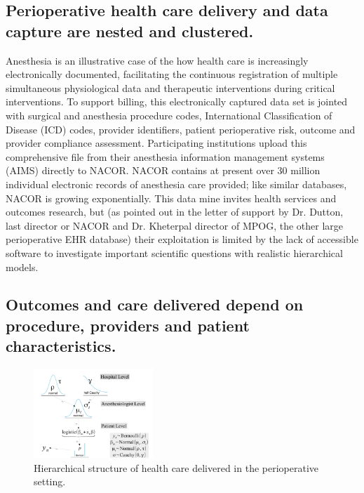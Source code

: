 \documentclass[11pt,notitlepage]{article}
\begin{document}
\subsection*{Perioperative health care delivery and data capture are nested and clustered.}
Anesthesia is an illustrative case of the how health care is increasingly 
electronically documented, facilitating the continuous registration of 
multiple simultaneous physiological data and therapeutic interventions during 
critical interventions. To support billing, this electronically captured data 
set is jointed with surgical and anesthesia procedure codes, International 
Classification of Disease (ICD) codes, provider identifiers, patient perioperative 
risk, outcome and provider compliance assessment. Participating institutions upload 
this comprehensive file from their anesthesia information management systems 
(AIMS) directly to NACOR. NACOR contains at present over 30 million individual 
electronic records of anesthesia care provided; like similar databases, NACOR is 
growing exponentially. This data mine invites health services and outcomes research, 
but (as pointed out in the letter of support by Dr. Dutton, last director or 
NACOR and Dr. Kheterpal director of MPOG, the other large perioperative EHR 
database) their exploitation is limited by the lack of accessible software to investigate important scientific questions with realistic hierarchical models.

\subsection*{Outcomes and care delivered depend on procedure, providers and patient characteristics.} 

\begin{figure} 
\includegraphics[width=0.4\textwidth]{Figures/DistrogramNACOR.pdf} 
\caption{Hierarchical structure of health care delivered in the perioperative setting.}
\label{fig:NACOR}
\end{figure}
\end{document}
